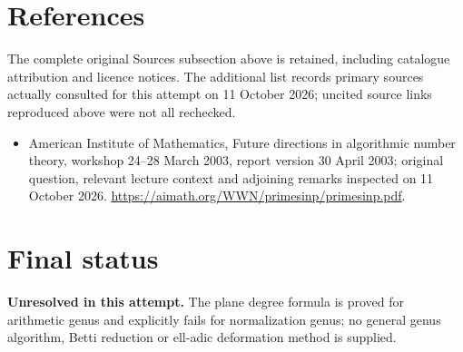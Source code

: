 \documentclass[11pt]{article}
\begin{document}
\section{References}
The complete original Sources subsection above is retained, including catalogue attribution and licence notices. The additional list records primary sources actually consulted for this attempt on 11 October 2026; uncited source links reproduced above were not all rechecked.
\begin{itemize}
\item American Institute of Mathematics, Future directions in algorithmic number theory, workshop 24--28 March 2003, report version 30 April 2003; original question, relevant lecture context and adjoining remarks inspected on 11 October 2026. \url{https://aimath.org/WWN/primesinp/primesinp.pdf}.
\end{itemize}
\section{Final status}
\textbf{Unresolved in this attempt.} The plane degree formula is proved for arithmetic genus and explicitly fails for normalization genus; no general genus algorithm, Betti reduction or ell-adic deformation method is supplied.
\end{document}
